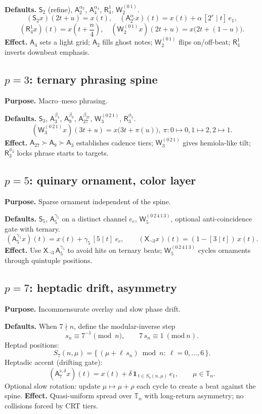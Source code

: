 \documentclass[12pt]{article}
\numberwithin{equation}{section}
\theoremstyle{plain}
\theoremstyle{definition}
\theoremstyle{remark}
\begin{document}
\noindent\textbf{Defaults.} $\mathsf{S}_2$ (refine), $\mathsf{A}_{2}^{\alpha_2}$, $\mathsf{A}_{4}^{\alpha_4}$, $\mathsf{R}_{4}^{1}$, $\mathsf{W}_2^{(0\,1)}$.
\[
(\mathsf{S}_2 x)(2t+u)=x(t),\quad
(\mathsf{A}_{2^r}^{\alpha}x)(t)=x(t)+\alpha\,[2^r\mid t]\,e_1,
\]
\[
(\mathsf{R}_{4}^{1}x)(t)=x\!\left(t+\frac{n}{4}\right),\quad
(\mathsf{W}_2^{(0\,1)}x)(2t+u)=x\big(2t+(1-u)\big).
\]
\textbf{Effect.} $\mathsf{A}_{4}$ sets a light grid; $\mathsf{A}_{2}$ fills ghost notes; $\mathsf{W}_2^{(0\,1)}$ flips on/off-beat; $\mathsf{R}_{4}^{1}$ inverts downbeat emphasis.

\subsection*{$p=3$: ternary phrasing spine}
\textbf{Purpose.} Macro–meso phrasing.

\noindent\textbf{Defaults.} $\mathsf{S}_3$, $\mathsf{A}_{3}^{\beta_3}$, $\mathsf{A}_{9}^{\beta_9}$, $\mathsf{A}_{27}^{\beta_{27}}$, $\mathsf{W}_3^{(0\,2\,1)}$, $\mathsf{R}_{3}^{\phi_3}$.
\[
(\mathsf{W}_3^{(0\,2\,1)}x)(3t+u)=x\big(3t+\pi(u)\big),\ \pi:0\mapsto0,1\mapsto2,2\mapsto1.
\]
\textbf{Effect.} $\mathsf{A}_{27}\succ \mathsf{A}_9\succ \mathsf{A}_3$ establishes cadence tiers; $\mathsf{W}_3^{(0\,2\,1)}$ gives hemiola-like tilt; $\mathsf{R}_{3}^{\phi_3}$ locks phrase starts to targets.

\subsection*{$p=5$: quinary ornament, color layer}
\textbf{Purpose.} Sparse ornament independent of the spine.

\noindent\textbf{Defaults.} $\mathsf{S}_5$, $\mathsf{A}_5^{\gamma_5}$ on a distinct channel $e_c$, $\mathsf{W}_5^{(0\,2\,4\,1\,3)}$, optional anti-coincidence gate with ternary.
\[
(\mathsf{A}_5^{\gamma_5}x)(t)=x(t)+\gamma_5\,[5\mid t]\;e_c,\qquad
(\mathsf{X}_{\neg 3}x)(t)=(1-[3\mid t])\,x(t).
\]
\textbf{Effect.} Use $\mathsf{X}_{\neg 3}\,\mathsf{A}_5^{\gamma_5}$ to avoid hits on ternary beats; $\mathsf{W}_5^{(0\,2\,4\,1\,3)}$ cycles ornaments through quintuple positions.

\subsection*{$p=7$: heptadic drift, asymmetry}
\textbf{Purpose.} Incommensurate overlay and slow phase drift.

\noindent\textbf{Defaults.} When $7\nmid n$, define the modular-inverse step
\[
s_n \equiv 7^{-1}\pmod n,\qquad 7\,s_n\equiv 1\ (\mathrm{mod}\ n).
\]
Heptad positions:
\[
S_7(n,\mu)=\big\{\,(\mu+\ell\,s_n)\bmod n:\ \ell=0,\dots,6\,\big\}.
\]
Heptadic accent (drifting gate):
\[
(\mathsf{A}_7^{\flat,\delta}x)(t)=x(t)+\delta\,\mathbf{1}_{\,t\in S_7(n,\mu)}\,e_1,\qquad \mu\in\mathbb{T}_n.
\]
Optional slow rotation: update $\mu\mapsto \mu+\rho$ each cycle to create a beat against the spine.
\textbf{Effect.} Quasi-uniform spread over $\mathbb{T}_n$ with long-return asymmetry; no collisions forced by CRT tiers.
\end{document}
